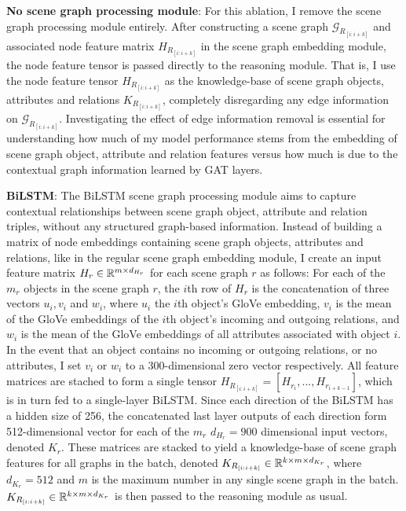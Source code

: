 
\textbf{No scene graph processing module}: For this ablation, I remove the scene graph processing module entirely. After constructing a scene graph \(\mathcal{G}_{R_{[i:i+k]}}\) and associated node feature matrix \(H_{R_{[i:i+k]}}\) in the scene graph embedding module, the node feature tensor is passed directly to the reasoning module. That is, I use the node feature tensor \(H_{R_{[i:i+k]}}\) as the knowledge-base of scene graph objects, attributes and relations \(K_{R_{[i:i+k]}}\), completely disregarding any edge information on \(\mathcal{G}_{R_{[i:i+k]}}\). Investigating the effect of edge information removal is essential for understanding how much of my model performance stems from the embedding of scene graph object, attribute and relation features versus how much is due to the contextual graph information learned by GAT layers.

\textbf{BiLSTM}: The BiLSTM scene graph processing module aims to capture contextual relationships between scene graph object, attribute and relation triples, without any structured graph-based information. Instead of building a matrix of node embeddings containing scene graph objects, attributes and relations, like in the regular scene graph embedding module, I create an input feature matrix \(H_r \in \mathbb{R}^{m \times d_{H_r}}\) for each scene graph \(r\) as follows: For each of the \(m_r\) objects in the scene graph \(r\), the \(i\)th row of \(H_r\) is the concatenation of three vectors \(u_i, v_i\) and \(w_i\), where \(u_i\) the \(i\)th object's GloVe embedding, \(v_i\) is the mean of the GloVe embeddings of the \(i\)th object's incoming and outgoing relations, and \(w_i\) is the mean of the GloVe embeddings of all attributes associated with object \(i\). In the event that an object contains no incoming or outgoing relations, or no attributes, I set \(v_i\) or \(w_i\) to a 300-dimensional zero vector respectively. All feature matrices are stached to form a single tensor \(H_{R_{[i:i+k]}} = [H_{r_i}, ..., H_{r_{i+k-1}}]\), which is in turn fed to a single-layer BiLSTM. Since each direction of the BiLSTM has a hidden size of 256, the concatenated last layer outputs of each direction form 512-dimensional vector for each of the \(m_r\) \(d_{H_r} = 900\) dimensional input vectors, denoted \(K_r\). These matrices are stacked to yield a knowledge-base of scene graph features for all graphs in the batch, denoted \(K_{R_{[i:i+k]}} \in \mathbb{R}^{k \times m \times d_{K_r}}\), where \(d_{K_r} = 512\) and \(m\) is the maximum number in any single scene graph in the batch. \(K_{R_{[i:i+k]}} \in \mathbb{R}^{k \times m \times d_{K_r}}\) is then passed to the reasoning module as usual.

